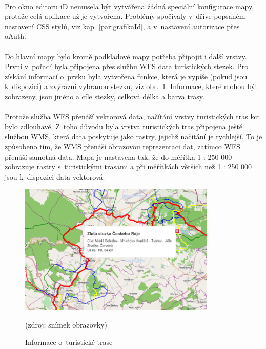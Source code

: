 \documentclass[11pt,a4paper,titlepage,oneside]{book}
\begin{document}
			\paragraph{} Pro okno editoru iD nemusela být vytvářena žádná speciální konfigurace mapy, protože celá aplikace už je vytvořena.  Problémy spočívaly v~dříve popsaném nastavení \ac{CSS} stylů, viz kap. \ref{par:grafikaId}, a v~nastavení autorizace přes oAuth.%

			\paragraph{} Do hlavní mapy bylo kromě podkladové mapy potřeba připojit i další vrstvy. První v~pořadí byla připojena přes službu \ac{WFS} data turistických stezek. Pro získání informací o~prvku byla vytvořena funkce, která je vypíše (pokud jsou k~dispozici) a zvýrazní vybranou stezku, viz obr.~\ref{fig:infoTrack}. Informace, které mohou být zobrazeny, jsou jméno a cíle stezky, celková délka a barva trasy.



			\paragraph{}Protože služba \ac{WFS} přenáší vektorová data, načítání vrstvy turistických tras \ac{kct} bylo zdlouhavé. Z~toho důvodu byla vrstva turistických tras připojena ještě službou \ac{WMS}, která data poskytuje jako rastry, jejichž načítání je rychlejší. To je způsobeno tím, že \ac{WMS} přenáší obrazovou reprezentaci dat, zatímco \ac{WFS} přenáší samotná data. Mapa je nastavena tak, že do měřítka 1 : 250 000 zobrazuje rastry s~turistickými trasami  a při měřítkách větších než 1 : 250 000 jsou k~dispozici data vektorová.
		\begin{figure}[!h]
			\begin{center}
				\includegraphics[width=9.4cm]{obrazky/toulavej/infoTrack.png}
				\caption{Informace o~turistické trase}
				\label{fig:infoTrack}
				(zdroj: snímek obrazovky)
			\end{center}
		\end{figure}	
\end{document}
